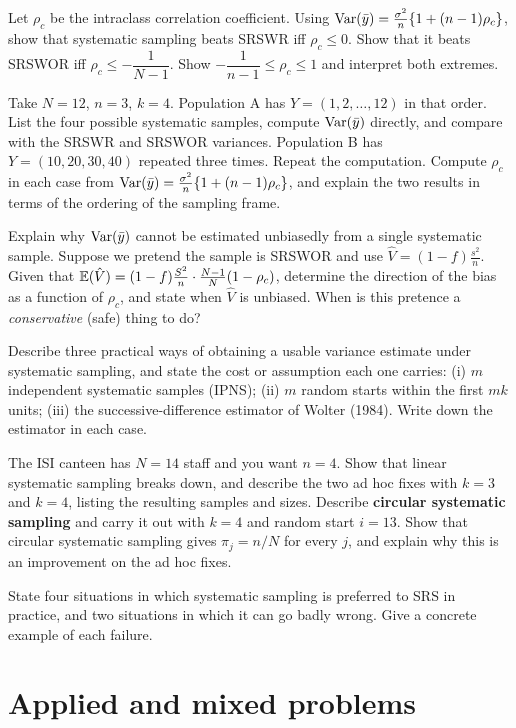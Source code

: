 Let $\rho_c$ be the intraclass correlation coefficient.
 Using $\operatorname{Var}(\bar{y})=\frac{\sigma^2}{n}\{1+(n-1)\rho_c\}$, show that systematic sampling
beats SRSWR iff $\rho_c\le0$.
 Show that it beats SRSWOR iff $\rho_c\le-\dfrac1{N-1}$.
 Show $-\dfrac1{n-1}\le\rho_c\le1$ and interpret both extremes.

Take $N=12$, $n=3$, $k=4$.
 Population A has $Y=(1,2,\dots,12)$ in that order. List the four possible systematic
samples, compute $\operatorname{Var}(\bar{y})$ directly, and compare with the SRSWR and SRSWOR variances.
 Population B has $Y=(10,20,30,40)$ repeated three times. Repeat the computation.
 Compute $\rho_c$ in each case from
$\operatorname{Var}(\bar{y})=\frac{\sigma^2}{n}\{1+(n-1)\rho_c\}$, and explain the two results in terms of the
ordering of the sampling frame.

 Explain why $\operatorname{Var}(\bar{y})$ cannot be estimated unbiasedly from a single systematic sample.
 Suppose we pretend the sample is SRSWOR and use $\hat V=(1-f)\frac{s^2}{n}$. Given that
$\mathbb{E}(\hat V)=(1-f)\frac{S^2}{n}\cdot\frac{N-1}{N}(1-\rho_c)$, determine the direction of the bias
as a function of $\rho_c$, and state when $\hat V$ is unbiased.
 When is this pretence a \emph{conservative} (safe) thing to do?

Describe three practical ways of obtaining a usable variance estimate under systematic sampling,
and state the cost or assumption each one carries:
(i) $m$ independent systematic samples (IPNS);
(ii) $m$ random starts within the first $mk$ units;
(iii) the successive-difference estimator of Wolter (1984).
Write down the estimator in each case.

The ISI canteen has $N=14$ staff and you want $n=4$.
 Show that linear systematic sampling breaks down, and describe the two ad hoc fixes with
$k=3$ and $k=4$, listing the resulting samples and sizes.
 Describe \textbf{circular systematic sampling} and carry it out with $k=4$ and random
start $i=13$.
 Show that circular systematic sampling gives $\pi_j=n/N$ for every $j$, and explain why
this is an improvement on the ad hoc fixes.

State four situations in which systematic sampling is preferred to SRS in practice, and two
situations in which it can go badly wrong. Give a concrete example of each failure.

\section{Applied and mixed problems}

